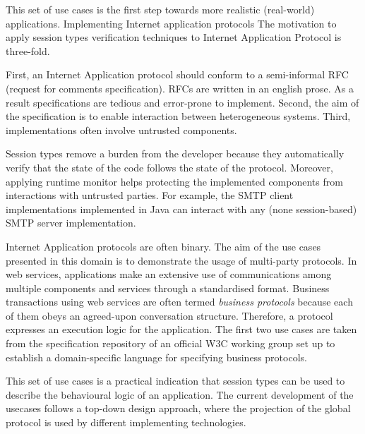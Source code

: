 This set of use cases is the first step towards more realistic (real-world) applications. 
Implementing Internet application protocols 
The motivation to apply session types verification techniques to Internet Application Protocol is three-fold. 
 
First, an Internet Application protocol should conform to a semi-informal RFC (request for comments specification). 
RFCs are written in an english prose. As a result specifications are tedious  and error-prone to implement. Second,  the aim of the specification is to enable interaction between heterogeneous systems. Third, implementations often involve untrusted components. 

Session types remove a burden from the developer because they automatically verify that the state of the code follows the state of the protocol. 
Moreover, applying runtime monitor helps protecting the implemented components from interactions with untrusted parties. For example, the SMTP client implementations implemented in Java can interact with any (none session-based) SMTP server implementation.   


 
Internet Application protocols are often binary. The aim of the use cases presented in this domain is to demonstrate the usage of multi-party protocols. In web services, applications make an extensive use of communications among multiple components and services through a standardised format. Business transactions using web services
are often termed \textit{business protocols} because each of them obeys an agreed-upon conversation structure.
Therefore, a protocol expresses an execution logic for the application. The first two use cases are taken from the specification repository of an official W3C working group set up to establish a domain-specific language for specifying business protocols. 
 
This set of use cases is a practical indication that session types can be used to describe the behavioural logic of an application. The current development of the usecases follows a top-down design approach, where the projection of the global protocol is used by different
implementing technologies.

